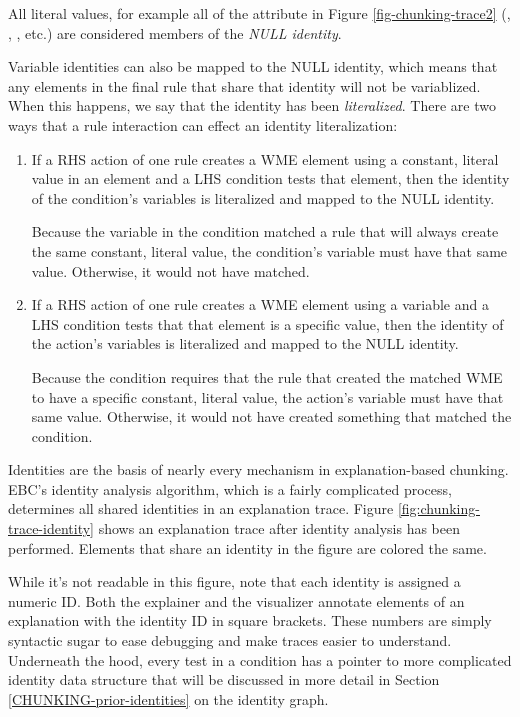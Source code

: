 All literal values, for example all of the attribute in Figure \ref{fig-chunking-trace2} (, , , etc.) are considered members of the \textit{NULL identity}.

Variable identities can also be mapped to the NULL identity, which means that any elements in the final rule that share that identity will not be variablized. When this happens, we say that the identity has been \textit{literalized}.  There are two ways that a rule interaction can effect an identity literalization:

\begin{enumerate}
	\item If a RHS action of one rule creates a WME element using a constant, literal value in an element and a LHS condition tests that element, then the identity of the condition's variables is literalized and mapped to the NULL identity. 

	Because the variable in the condition matched a rule that will always create the same constant, literal value, the condition's variable must have that same value.  Otherwise, it would not have matched.
	\vspace{-6pt}
	
	\item If a RHS action of one rule creates a WME element using a variable and a LHS condition tests that that element is a specific value, then the identity of the action's variables is literalized and mapped to the NULL identity. 

	Because the condition requires that the rule that created the matched WME to have a specific constant, literal value, the action's variable must have that same value.  Otherwise, it would not have created something that matched the condition. 
\end{enumerate}

Identities are the basis of nearly every mechanism in explanation-based chunking.  EBC's identity analysis algorithm, which is a fairly complicated process, determines all shared identities in an explanation trace.  Figure \ref{fig:chunking-trace-identity} shows an explanation trace after identity analysis has been performed.  Elements that share an identity in the figure are colored the same.

While it's not readable in this figure, note that each identity is assigned a numeric ID.  Both the explainer and the visualizer annotate elements of an explanation with the identity ID in square brackets.  These numbers are simply syntactic sugar to ease debugging and make traces easier to understand.  Underneath the hood, every test in a condition has a pointer to more complicated identity data structure that will be discussed in more detail in Section \ref{CHUNKING-prior-identities} on the identity graph. 

